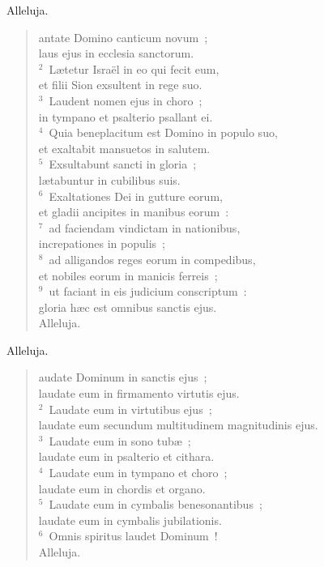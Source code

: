\bchapter[Psalm]
Alleluja. \begin{verse}antate Domino canticum novum~;\\ laus ejus in ecclesia sanctorum.\\
${}^{2}$~L\ae tetur Isra\"el in eo qui fecit eum,\\ et filii Sion exsultent in rege suo.\\
${}^{3}$~Laudent nomen ejus in choro~;\\ in tympano et psalterio psallant ei.\\
${}^{4}$~Quia beneplacitum est Domino in populo suo,\\ et exaltabit mansuetos in salutem.\\
${}^{5}$~Exsultabunt sancti in gloria~;\\ l\ae tabuntur in cubilibus suis.\\
${}^{6}$~Exaltationes Dei in gutture eorum,\\ et gladii ancipites in manibus eorum~:\\
${}^{7}$~ad faciendam vindictam in nationibus,\\ increpationes in populis~;\\
${}^{8}$~ad alligandos reges eorum in compedibus,\\ et nobiles eorum in manicis ferreis~;\\
${}^{9}$~ut faciant in eis judicium conscriptum~:\\ gloria h\ae c est omnibus sanctis ejus.\\ Alleluja.\end{verse}



\bchapter[Psalm]
Alleluja. \begin{verse}audate Dominum in sanctis ejus~;\\ laudate eum in firmamento virtutis ejus.\\
${}^{2}$~Laudate eum in virtutibus ejus~;\\ laudate eum secundum multitudinem magnitudinis ejus.\\
${}^{3}$~Laudate eum in sono tub\ae~;\\ laudate eum in psalterio et cithara.\\
${}^{4}$~Laudate eum in tympano et choro~;\\ laudate eum in chordis et organo.\\
${}^{5}$~Laudate eum in cymbalis benesonantibus~;\\ laudate eum in cymbalis jubilationis.\\
${}^{6}$~Omnis spiritus laudet Dominum~!\\ Alleluja.\end{verse}


